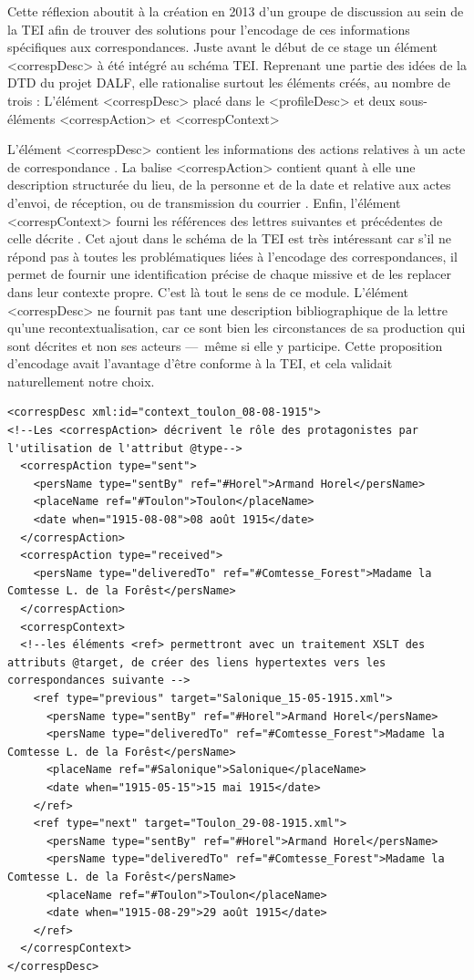 \documentclass[12pt,a4paper]{book} %
\begin{document}
Cette réflexion aboutit à la création en 2013 d'un groupe de discussion au sein de la TEI afin de trouver des solutions pour l'encodage de ces informations spécifiques aux correspondances. Juste avant le début de ce stage un élément <correspDesc> à été intégré au schéma TEI. Reprenant une partie des idées de la DTD du projet DALF, elle rationalise surtout les éléments créés, au nombre de trois : L'élément <correspDesc> placé dans le <profileDesc> et deux sous-éléments <correspAction> et <correspContext>

L'élément <correspDesc> \og contient les informations des actions relatives à un acte de correspondance \fg{}. La balise <correspAction> contient quant à elle \og une description structurée du lieu, de la personne et de la date et relative aux actes d'envoi, de réception, ou de transmission du courrier \fg{}. Enfin, l'élément <correspContext> \og fourni les références des lettres suivantes et précédentes de celle décrite \fg{}. Cet ajout dans le schéma de la TEI est très intéressant car s'il ne répond pas à toutes les problématiques liées à l'encodage des correspondances, il permet de fournir une identification précise de chaque missive et de les replacer dans leur contexte propre. C'est là tout le sens de ce module. L'élément <correspDesc> ne fournit pas tant une description bibliographique de la lettre qu'une recontextualisation, car ce sont bien les circonstances de sa production qui sont décrites et non ses acteurs ---~même si elle y participe. Cette proposition d'encodage avait l'avantage d'être conforme à la TEI, et cela validait naturellement notre choix.
\bigskip

\begin{lstlisting}
<correspDesc xml:id="context_toulon_08-08-1915">
<!--Les <correspAction> décrivent le rôle des protagonistes par l'utilisation de l'attribut @type-->
  <correspAction type="sent">
    <persName type="sentBy" ref="#Horel">Armand Horel</persName>
    <placeName ref="#Toulon">Toulon</placeName>
    <date when="1915-08-08">08 août 1915</date>
  </correspAction>
  <correspAction type="received">
    <persName type="deliveredTo" ref="#Comtesse_Forest">Madame la Comtesse L. de la Forêst</persName>
  </correspAction>
  <correspContext>
  <!--les éléments <ref> permettront avec un traitement XSLT des attributs @target, de créer des liens hypertextes vers les correspondances suivante -->
    <ref type="previous" target="Salonique_15-05-1915.xml">
      <persName type="sentBy" ref="#Horel">Armand Horel</persName>
      <persName type="deliveredTo" ref="#Comtesse_Forest">Madame la Comtesse L. de la Forêst</persName>                  
      <placeName ref="#Salonique">Salonique</placeName>
      <date when="1915-05-15">15 mai 1915</date>
    </ref>
    <ref type="next" target="Toulon_29-08-1915.xml">
      <persName type="sentBy" ref="#Horel">Armand Horel</persName>
      <persName type="deliveredTo" ref="#Comtesse_Forest">Madame la Comtesse L. de la Forêst</persName> 
      <placeName ref="#Toulon">Toulon</placeName>
      <date when="1915-08-29">29 août 1915</date>
    </ref>
  </correspContext>
</correspDesc>
\end{lstlisting}
\bigskip
\end{document}

